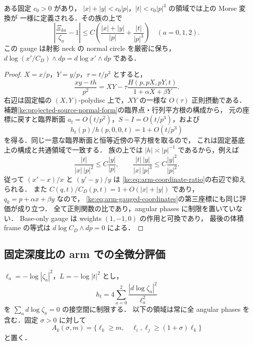 \begin{lemma}
\label{ke:arm-coordinate-ratio}
ある固定 $c_0>0$ があり，
$|x|+|y|<c_0|p|$，$|t|<c_0|p|^3$ の領域では上の Morse 変換が
一様に定義される．その族の上で
\begin{equation}\label{ke:eq:arm-coordinate-ratio}
 \left|\frac{\Xi_{ka}}{\zeta_a}-1\right|
 \le C\left(\frac{|x|+|y|}{|p|}+\frac{|t|}{|p|^3}\right)
 \quad(a=0,1,2).
\end{equation}
この gauge は射影 neck の normal circle を厳密に保ち，
$d\log(x'/C_D)\wedge dp=d\log x'\wedge dp$ である．
\end{lemma}
\begin{proof}
$X=x/p$，$Y=y/p$，$\tau=t/p^3$ とすると，
\[
 \frac{xy-th}{p^2}
 =XY-\tau\frac{H(p,pX,pY,t)}{1+\alpha X+\beta Y}.
\]
右辺は固定幅の $(X,Y)$-polydisc 上で，$XY$ の一様な $O(\tau)$ 正則摂動である．
補題\ref{ke:projected-source-normal-form}の臨界点・行列平方根の構成から，
元の座標に戻すと臨界断面 $a_t=O(t/p^2)$，$S-I=O(t/p^3)$，および
\[
 h_t(p)/h(p,0,0,t)=1+O(t/p^3)
\]
を得る．同じ一意な臨界断面と恒等近傍の平方根を取るので，
これは固定基底上の構成と共通領域で一致する．
族の上では $|h|\asymp |p|^{-1}$ であるから，例えば
\[
 \frac{|t|}{|x|\,|p|^2}\le C\frac{|y|}{|p|},\qquad
 \frac{|t|\,|y|}{|x|\,|p|^3}\le C\frac{|y|^2}{|p|^2}.
\]
従って $(x'-x)/x$ と $(y'-y)/y$ は
\eqref{ke:eq:arm-coordinate-ratio}の右辺で抑えられる．
また $C(q,t)/C_D(p,t)=1+O(|x|+|y|)$ であり，
$q_k=p+\alpha x+\beta y$ なので，
\eqref{ke:eq:arm-gauged-coordinates}の第三座標にも同じ評価が成り立つ．
全て正則関数の比であり，angular phases に制限を置いていない．
Base-only gauge は weights $(1,-1,0)$ の作用と可換であり，
最後の体積 frame の等式は $d\log C_D\wedge dp=0$ による．
\end{proof}

\subsection{固定深度比の arm での全微分評価}

$\ell_a=-\log|\zeta_a|^2$，$L=-\log|t|^2$ とし，
\[
 h_t=4\sum_{a=0}^2\frac{|d\log\zeta_a|^2}{\ell_a^2}
\]
を $\sum_a d\log\zeta_a=0$ の接空間に制限する．
以下の領域は常に全 angular phases を含む．固定 $\sigma>0$ に対して
\[
 A_k(\sigma,m)=\{\ell_k\ge m,\quad
          \ell_i,\ell_j\ge(1+\sigma)\ell_k\}
\]
と置く．

